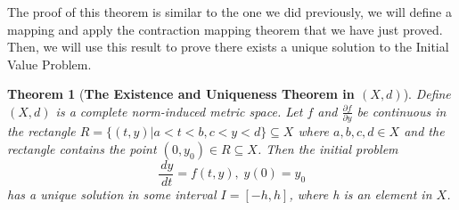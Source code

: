 \documentclass{article}
\newtheorem{theorem}{Theorem}[section]
\theoremstyle{definition}
\theoremstyle{remark}
\theoremstyle{example}
\begin{document}
The proof of this theorem is similar to the one we did previously, we will define a mapping and apply the contraction mapping theorem that we have just proved. Then, we will use this result to prove there exists a unique solution to the Initial Value Problem.

\begin{theorem}[\textbf{The Existence and Uniqueness Theorem in $(X,d)$}]\cite{r_kent_nagle_fundamentals_2011}\label{thm:EUTXd}
    Define $(X,d)$ is a complete norm-induced metric space. Let $f$ and $\tfrac{\partial f}{\partial y}$ be continuous in the rectangle $R = \{(t,y)|a < t < b, c < y < d\} \subseteq X$ where $a,b,c,d \in X$ and the rectangle contains the point $(0, y_0) \in R \subseteq X$. Then the initial problem
    \begin{equation}
        \dfrac{\,dy}{\,dt} = f(t,y),\; y(0) = y_0
    \end{equation}
has a unique solution in some interval $I = [-h, h]$, where h is an element in $X$.
\end{theorem}
\end{document}
